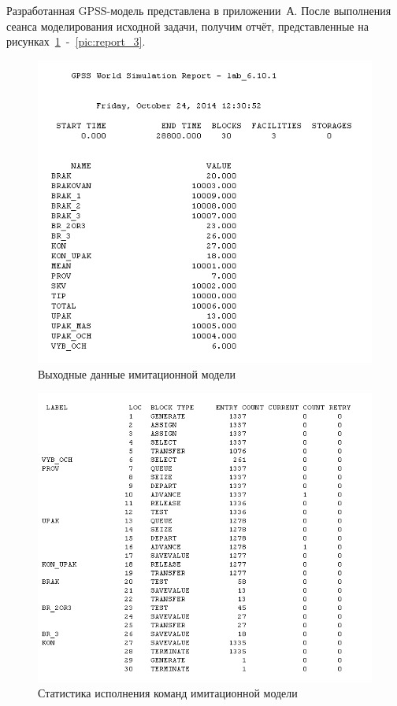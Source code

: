 Разработанная GPSS-модель представлена в приложении~А. После выполнения сеанса
моделирования исходной задачи, получим отчёт, представленные на
рисунках~\ref{pic:report_1}~-~\ref{pic:report_3}.

\begin{figure}[h!]
  \centering
  \includegraphics[width=0.75\linewidth]{pic/report_1}
  \caption{Выходные данные имитационной модели}
  \label{pic:report_1}
\end{figure}

\begin{figure}[h!]
  \centering
  \includegraphics[width=0.75\linewidth]{pic/report_2}
  \caption{Статистика исполнения команд имитационной модели}
  \label{pic:report_2}
\end{figure}

\newpage

